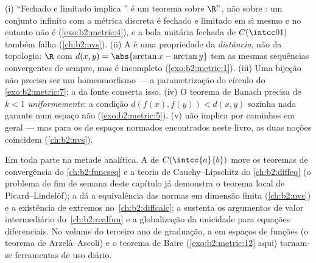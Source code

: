 \begin{remark}\label{rem:b2:metric:pitfalls}
(i) ``Fechado e limitado implica '' é um teorema sobre
$\R^n$, não sobre : um conjunto infinito com a
métrica discreta é fechado e limitado em si mesmo e no entanto não é 
(\cref{exo:b2:metric:4}), e a bola unitária fechada de
$C(\intcc01)$ também falha (\cref{ch:b2:nvs}). (ii) A  é
uma propriedade da \emph{distância}, não da topologia: $\R$
com $d(x,y) = \abs{\arctan x - \arctan y}$ tem as mesmas sequências
convergentes de sempre, mas é incompleto
(\cref{exo:b2:metric:1}). (iii) Uma bijeção  não precisa
ser um homeomorfismo --- a parametrização do círculo do
\cref{exo:b2:metric:7}; a  da fonte conserta isso.
(iv) O teorema de Banach precisa de $k < 1$ \emph{uniformemente}: a
condição $d(f(x), f(y)) < d(x,y)$ sozinha nada garante num espaço
não  (\cref{exo:b2:metric:5}). (v)  não
implica  por caminhos em geral --- mas para os 
de espaços normados encontrados neste livro, as duas noções coincidem
(\cref{ch:b2:nvs}).
\end{remark}

\begin{remark}
Em toda parte na metade analítica. A  de
$C(\intcc{a}{b})$ move os teoremas de convergência do
\cref{ch:b2:funcseq} e a teoria de Cauchy--Lipschitz do
\cref{ch:b2:diffeq} (o problema de fim de semana deste capítulo já demonstra o
teorema local de Picard--Lindelöf); a  dá a
equivalência das normas em dimensão finita (\cref{ch:b2:nvs}) e
a existência de extremos no~\cref{ch:b2:diffcalc}; a 
sustenta os argumentos de valor intermediário do~\cref{ch:b2:realfun}
e a globalização da unicidade para equações diferenciais. No
volume do terceiro ano de graduação, a  em espaços de funções (o
teorema de Arzelà--Ascoli) e o teorema de Baire
(\cref{exo:b2:metric:12} aqui) tornam-se ferramentas de uso diário.
\end{remark}

